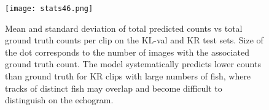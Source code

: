 \begin{figure}[t]
  \centering
  \texttt{[image: stats46.png]}
  \vspace{-5pt}
  \caption{\footnotesize 
 Mean and standard deviation of total predicted counts vs total ground truth counts per clip on the KL-val and KR test sets. Size of the dot corresponds to the number of images with the associated ground truth count. The model systematically predicts lower counts than ground truth for KR clips with large numbers of fish, where tracks of distinct fish may overlap and become difficult to distinguish on the echogram.
  }
  \vspace{-10pt}
  \label{fig:preds_gt}
\end{figure}